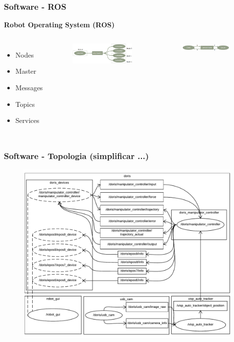 \documentclass{beamer}
\begin{document}
\begin{frame}
\frametitle{Software - ROS}
\textbf{Robot Operating System (ROS)}
\begin{columns}[c] %

\begin{itemize}
\item Nodes
\item Master
\item Messages
\item Topics
\item Services
\end{itemize}

\begin{figure}
  \includegraphics[width=\linewidth]{./img/topics.png}
\end{figure}
\begin{figure}
  \includegraphics[width=\linewidth]{./img/services.png}
\end{figure}
\end{columns}
\end{frame}


\begin{frame}
\frametitle{Software - Topologia (simplificar ...)}
\begin{figure}
\includegraphics[width=0.8\linewidth]{./img/node_diagram.pdf}
\end{figure}
\end{frame}
\end{document}
